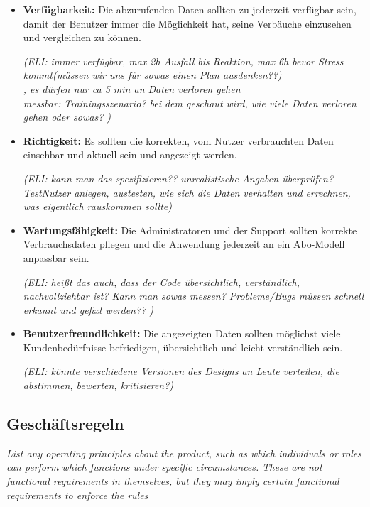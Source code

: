 \begin{itemize}
    \item \textbf{Verfügbarkeit: }
    Die abzurufenden Daten sollten zu jederzeit verfügbar sein,
    damit der Benutzer immer die Möglichkeit hat, 
    seine Verbäuche einzusehen und vergleichen zu können.
    
    \textit{(ELI: immer verfügbar, max 2h Ausfall bis Reaktion, 
    max 6h bevor Stress kommt(müssen wir uns für sowas einen Plan ausdenken??)\\,
    es dürfen nur ca 5 min an Daten verloren gehen\\
    messbar: Trainingsszenario? bei dem geschaut wird, 
    wie viele Daten verloren gehen oder sowas? )}
    
    \item \textbf{Richtigkeit: }
    Es sollten die korrekten, 
    vom Nutzer verbrauchten Daten einsehbar und 
    aktuell sein und angezeigt werden.

\textit{(ELI: kann man das spezifizieren?? unrealistische Angaben überprüfen?
\\TestNutzer anlegen, austesten, 
    wie sich die Daten verhalten und errechnen, 
    was eigentlich rauskommen sollte)}
    \item \textbf{Wartungsfähigkeit: }
    Die Administratoren und der Support sollten korrekte Verbrauchsdaten 
    pflegen und die Anwendung jederzeit an ein Abo-Modell anpassbar sein.

    \textit{(ELI: heißt das auch, dass der Code übersichtlich, verständlich, 
    nachvollziehbar ist? Kann man sowas messen?
    Probleme/Bugs müssen schnell erkannt und gefixt werden?? )}

    \item \textbf{Benutzerfreundlichkeit: }
    Die angezeigten Daten sollten möglichst viele Kundenbedürfnisse 
    befriedigen, übersichtlich und leicht verständlich sein.

    \textit{(ELI: könnte verschiedene Versionen des Designs an 
    Leute verteilen, die abstimmen, bewerten, kritisieren?)}
\end{itemize}

\subsection{Geschäftsregeln}
\textit{List any operating principles about the product, 
such as which individuals or roles can perform which functions under specific circumstances. 
These are not functional requirements in themselves, 
but they may imply certain functional requirements to enforce the rules}
